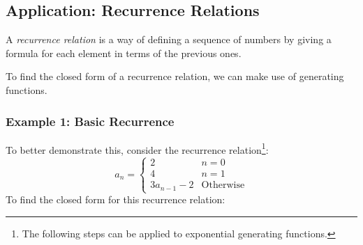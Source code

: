 \documentclass[letterpaper]{article}
\begin{document}
\subsection{Application: Recurrence Relations}
A \emph{recurrence relation} is a way of defining a sequence of numbers by giving a formula for each element in terms of the previous ones. 

\bigskip 

To find the closed form of a recurrence relation, we can make use of generating functions.

\subsubsection{Example 1: Basic Recurrence}
To better demonstrate this, consider the recurrence relation\footnote{The following steps can be applied to exponential generating functions.}:
\[a_n = \begin{cases}
    2 & n = 0 \\
    4 & n = 1 \\  
    3a_{n - 1} - 2 & \text{Otherwise}
\end{cases}\]
To find the closed form for this recurrence relation: 
\end{document}

